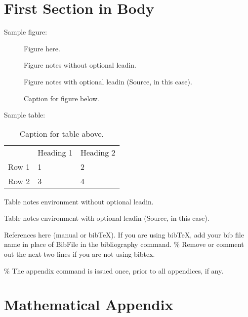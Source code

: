 \documentclass[AER]{AEA}
\begin{document}
\section{First Section in Body}

Sample figure:

\begin{figure}
Figure here.

\caption{Caption for figure below.}
\begin{figurenotes}
Figure notes without optional leadin.
\end{figurenotes}
\begin{figurenotes}[Source]
Figure notes with optional leadin (Source, in this case).
\end{figurenotes}
\end{figure}

Sample table:

\begin{table}
\caption{Caption for table above.}

\begin{tabular}{lll}
& Heading 1 & Heading 2 \\
Row 1 & 1 & 2 \\
Row 2 & 3 & 4%
\end{tabular}
\begin{tablenotes}
Table notes environment without optional leadin.
\end{tablenotes}
\begin{tablenotes}[Source]
Table notes environment with optional leadin (Source, in this case).
\end{tablenotes}
\end{table}

References here (manual or bibTeX). If you are using bibTeX, add your
bib file name in place of BibFile in the bibliography command. \% Remove
or comment out the next two lines if you are not using bibtex.




\% The appendix command is issued once, prior to all appendices, if any.
\appendix

\section{Mathematical Appendix}
\end{document}
